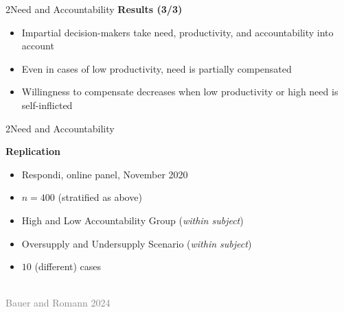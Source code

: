 \documentclass[xcolor=table,9pt,aspectratio=169]{beamer}
\begin{document}
\begin{frame}{\vspace*{10mm}2\hspace*{1em}Need and Accountability}
\textbf{Results (3/3)}\\
\medskip
\begin{itemize}
   \item Impartial decision-makers take need, productivity, and accountability into account
   \item Even in cases of low productivity, need is partially compensated
   \item Willingness to compensate decreases when low productivity or high need is self-inflicted
\end{itemize}
\end{frame}


\begin{frame}{\vspace*{10mm}2\hspace*{1em}Need and Accountability}
\begin{multicols}{2}
   \textbf{Replication}\\
   \medskip
   \begin{itemize}
      \item Respondi, online panel, November 2020
      \item $n=400$ (stratified as above)
      \item High and Low Accountability Group (\textit{within subject})
      \item Oversupply and Undersupply Scenario (\textit{within subject})
      \item $10$ (different) cases
   \end{itemize}
   \vfill
   \begin{center}
      \\
      \textcolor{gray}{Bauer and Romann 2024}
   \end{center}
\end{multicols}
\end{frame}
\end{document}
